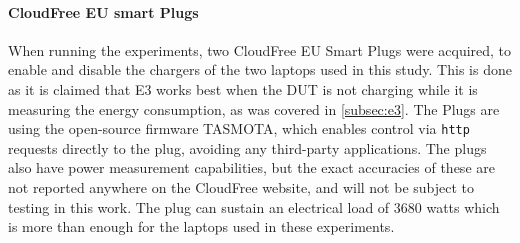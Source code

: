 \paragraph*{CloudFree EU smart Plugs}

When running the experiments, two CloudFree EU Smart Plugs\cite{CloudFreeEUSMartPlug} were acquired, to enable and disable the chargers of the two laptops used in this study. This is done as it is claimed that E3  works best when the DUT is not charging while it is measuring the energy consumption, as was covered in \cref{subsec:e3}. The Plugs are using the open-source firmware TASMOTA\cite{TomatoGit}, which enables control via \texttt{http} requests directly to the plug, avoiding any third-party applications. The plugs also have power measurement capabilities, but the exact accuracies of these are not reported anywhere on the CloudFree website, and will not be subject to testing in this work. The plug can sustain an electrical load of 3680 watts which is more than enough for the laptops used in these experiments.\cite{CloudFreeEUSMartPlug}